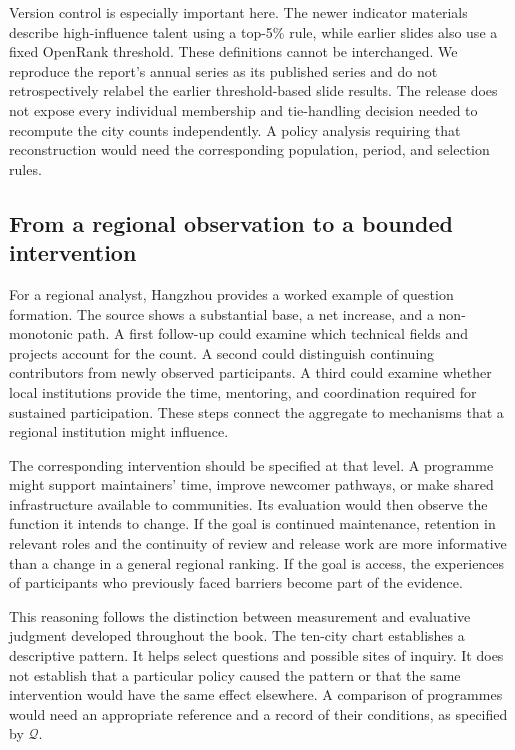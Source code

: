 Version control is especially important here. The newer indicator materials describe high-influence talent using a top-5\% rule, while earlier slides also use a fixed OpenRank threshold. These definitions cannot be interchanged. We reproduce the report's annual series as its published series and do not retrospectively relabel the earlier threshold-based slide results. The release does not expose every individual membership and tie-handling decision needed to recompute the city counts independently. A policy analysis requiring that reconstruction would need the corresponding population, period, and selection rules.

\subsection{From a regional observation to a bounded intervention}
For a regional analyst, Hangzhou provides a worked example of question formation. The source shows a substantial base, a net increase, and a non-monotonic path. A first follow-up could examine which technical fields and projects account for the count. A second could distinguish continuing contributors from newly observed participants. A third could examine whether local institutions provide the time, mentoring, and coordination required for sustained participation. These steps connect the aggregate to mechanisms that a regional institution might influence.

The corresponding intervention should be specified at that level. A programme might support maintainers' time, improve newcomer pathways, or make shared infrastructure available to communities. Its evaluation would then observe the function it intends to change. If the goal is continued maintenance, retention in relevant roles and the continuity of review and release work are more informative than a change in a general regional ranking. If the goal is access, the experiences of participants who previously faced barriers become part of the evidence.

This reasoning follows the distinction between measurement and evaluative judgment developed throughout the book. The ten-city chart establishes a descriptive pattern. It helps select questions and possible sites of inquiry. It does not establish that a particular policy caused the pattern or that the same intervention would have the same effect elsewhere. A comparison of programmes would need an appropriate reference and a record of their conditions, as specified by \(\mathcal Q\).

